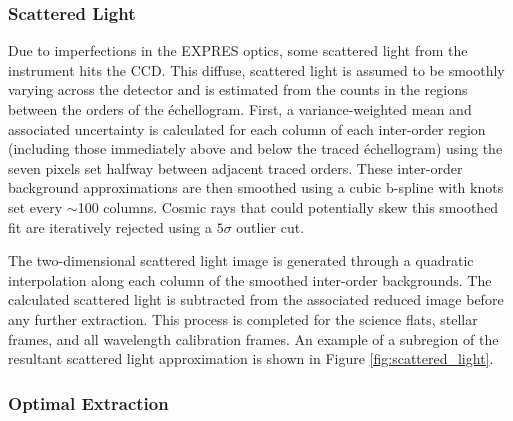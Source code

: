 \subsubsection{Scattered Light}
\label{pipeline:scattered-light}

Due to imperfections in the EXPRES optics, some scattered light from the instrument hits the CCD. This diffuse, scattered light is assumed to be smoothly varying across the detector and is estimated from the counts in the regions between the orders of the \'echellogram. First, a variance-weighted mean and associated uncertainty is calculated for each column of each inter-order region (including those immediately above and below the traced \'echellogram) using the seven pixels set halfway between adjacent traced orders. These inter-order background approximations are then smoothed using a cubic b-spline with knots set every $\sim$100 columns. Cosmic rays that could potentially skew this smoothed fit are iteratively rejected using a $5\sigma$ outlier cut.

The two-dimensional scattered light image is generated through a quadratic interpolation along each column of the smoothed inter-order backgrounds. The calculated scattered light is subtracted from the associated reduced image before any further extraction. This process is completed for the science flats, stellar frames, and all wavelength calibration frames. An example of a subregion of the resultant scattered light approximation is shown in Figure \ref{fig:scattered_light}.

\subsubsection{Optimal Extraction}
\label{pipeline:optimal-extraction}

